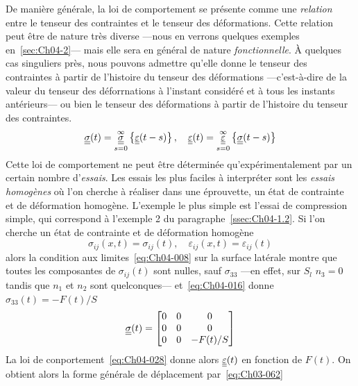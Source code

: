 De manière générale, la loi de comportement se présente comme une \emph{relation} entre le tenseur des contraintes et le tenseur des déformations.
Cette relation peut être de nature très diverse ---nous en verrons quelques exemples en~\ref{sec:Ch04-2}--- mais elle sera en général de nature \emph{fonctionnelle}.
À quelques cas singuliers près, nous pouvons admettre qu'elle donne le tenseur des contraintes à partir de l'histoire du tenseur des déformations ---c'est-à-dire de la valeur du tenseur des déforrnations à l'instant considéré et à tous les instants antérieurs--- ou bien le tenseur des déformations à partir de l'histoire du tenseur des contraintes.
\begin{equation}
    \underline{\underline{\sigma}} (t) = \mathop{\underline{\underline{\sigma}}}_{s=0}^{\infty} \left\{ \underline{\underline{\varepsilon}} (t-s) \right\}, \quad \underline{\underline{\varepsilon}} (t) = \mathop{\underline{\underline{\varepsilon}}}_{s=0}^{\infty} \left\{ \underline{\underline{\sigma}} (t-s) \right\}
    \label{eq:Ch04-028}
\end{equation}
Cette loi de comportement ne peut être déterminée qu'expérimentalement par un certain nombre d'\emph{essais}.
Les essais les plus faciles à interpréter sont les \emph{essais homogènes} où l'on cherche à réaliser dans une éprouvette, un état de contrainte et de déformation homogène.
L'exemple le plus simple est l'essai de compression simple, qui correspond à l'exemple 2 du paragraphe~\ref{ssec:Ch04-1.2}.
Si l'on cherche un état de contrainte et de déformation homogène
\begin{equation}
    \sigma_{ij} (x,t) = \sigma_{ij}(t), \quad \varepsilon_{ij}(x,t) = \varepsilon_{ij}(t)
    \label{eq:Ch04-029}
\end{equation}
alors la condition aux limites~\eqref{eq:Ch04-008} sur la surface latérale montre que toutes les composantes de $\sigma_{ij}(t)$ sont nulles, sauf $\sigma_{33}$ ---en effet, sur $S_l$ $n_3=0$ tandis que $n_1$ et $n_2$ sont quelconques--- et~\eqref{eq:Ch04-016} donne $\sigma_{33}(t)=-F(t)/S$
\begin{equation}
    \underline{\underline{\sigma}}(t) = \begin{bmatrix}
        0 & 0 & 0 \\
        0 & 0 & 0 \\
        0 & 0 & -F(t)/S
    \end{bmatrix}
    \label{eq:Ch04-030}
\end{equation}
La loi de conportement~\eqref{eq:Ch04-028} donne alors $\underline{\underline{\varepsilon}}(t)$ en fonction de $F(t)$.
On obtient alors la forme générale de déplacement par~\eqref{eq:Ch03-062}

